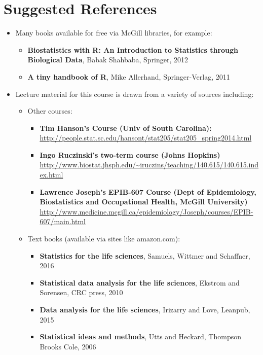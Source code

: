 \documentclass[
]{book}
\providecommand{\tightlist}{%
  \setlength{\itemsep}{0pt}\setlength{\parskip}{0pt}}
\begin{document}
\hypertarget{suggested-references}{%
\section*{Suggested References}\label{suggested-references}}

\begin{itemize}
\tightlist
\item
  Many books available for free via McGill libraries, for example:

  \begin{itemize}
  \tightlist
  \item
    \textbf{Biostatistics with R: An Introduction to Statistics through Biological Data}, Babak Shahbaba, Springer, 2012
  \item
    \textbf{A tiny handbook of R}, Mike Allerhand, Springer-Verlag, 2011
  \end{itemize}
\item
  Lecture material for this course is drawn from a variety of sources including:

  \begin{itemize}
  \tightlist
  \item
    Other courses:

    \begin{itemize}
    \tightlist
    \item
      \textbf{Tim Hanson's Course (Univ of South Carolina):} \url{http://people.stat.sc.edu/hansont/stat205/stat205_spring2014.html}
    \item
      \textbf{Ingo Ruczinski's two-term course (Johns Hopkins)} \url{http://www.biostat.jhsph.edu/~iruczins/teaching/140.615/140.615.index.html}
    \item
      \textbf{Lawrence Joseph's EPIB-607 Course (Dept of Epidemiology, Biostatistics and Occupational Health, McGill University)}
      \url{http://www.medicine.mcgill.ca/epidemiology/Joseph/courses/EPIB-607/main.html}
    \end{itemize}
  \item
    Text books (available via sites like amazon.com):

    \begin{itemize}
    \tightlist
    \item
      \textbf{Statistics for the life sciences}, Samuels, Wittmer and Schaffner, 2016\\
    \item
      \textbf{Statistical data analysis for the life sciences}, Ekstrom and Sorensen, CRC press, 2010
    \item
      \textbf{Data analysis for the life sciences}, Irizarry and Love, Leanpub, 2015
    \item
      \textbf{Statistical ideas and methods}, Utts and Heckard, Thompson Brooks Cole, 2006
    \end{itemize}
  \end{itemize}
\end{itemize}
\end{document}
